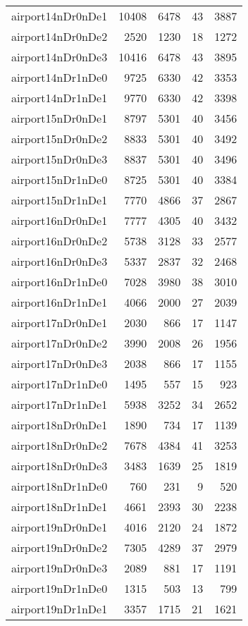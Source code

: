 \begin{longtable}{lrrrr}
airport14nDr0nDe1 & 10408 & 6478 & 43 & 3887 \\
airport14nDr0nDe2 & 2520 & 1230 & 18 & 1272 \\
airport14nDr0nDe3 & 10416 & 6478 & 43 & 3895 \\
airport14nDr1nDe0 & 9725 & 6330 & 42 & 3353 \\
airport14nDr1nDe1 & 9770 & 6330 & 42 & 3398 \\
airport15nDr0nDe1 & 8797 & 5301 & 40 & 3456 \\
airport15nDr0nDe2 & 8833 & 5301 & 40 & 3492 \\
airport15nDr0nDe3 & 8837 & 5301 & 40 & 3496 \\
airport15nDr1nDe0 & 8725 & 5301 & 40 & 3384 \\
airport15nDr1nDe1 & 7770 & 4866 & 37 & 2867 \\
airport16nDr0nDe1 & 7777 & 4305 & 40 & 3432 \\
airport16nDr0nDe2 & 5738 & 3128 & 33 & 2577 \\
airport16nDr0nDe3 & 5337 & 2837 & 32 & 2468 \\
airport16nDr1nDe0 & 7028 & 3980 & 38 & 3010 \\
airport16nDr1nDe1 & 4066 & 2000 & 27 & 2039 \\
airport17nDr0nDe1 & 2030 & 866 & 17 & 1147 \\
airport17nDr0nDe2 & 3990 & 2008 & 26 & 1956 \\
airport17nDr0nDe3 & 2038 & 866 & 17 & 1155 \\
airport17nDr1nDe0 & 1495 & 557 & 15 & 923 \\
airport17nDr1nDe1 & 5938 & 3252 & 34 & 2652 \\
airport18nDr0nDe1 & 1890 & 734 & 17 & 1139 \\
airport18nDr0nDe2 & 7678 & 4384 & 41 & 3253 \\
airport18nDr0nDe3 & 3483 & 1639 & 25 & 1819 \\
airport18nDr1nDe0 & 760 & 231 & 9 & 520 \\
airport18nDr1nDe1 & 4661 & 2393 & 30 & 2238 \\
airport19nDr0nDe1 & 4016 & 2120 & 24 & 1872 \\
airport19nDr0nDe2 & 7305 & 4289 & 37 & 2979 \\
airport19nDr0nDe3 & 2089 & 881 & 17 & 1191 \\
airport19nDr1nDe0 & 1315 & 503 & 13 & 799 \\
airport19nDr1nDe1 & 3357 & 1715 & 21 & 1621 \\

\end{longtable}
